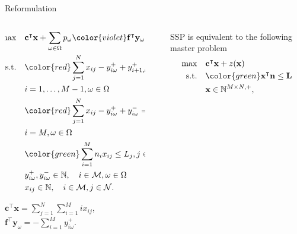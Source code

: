 \begin{frame}{Reformulation}
  \begin{columns}
    \begin{column}{0.49\textwidth}
      \begin{scriptsize}
        \begin{equation*}
          \begin{aligned}
          \hspace{-10mm}
          \max \quad & \mathbf{c}^{\intercal} \mathbf{x} + \sum_{\omega \in \Omega} p_{\omega} 
          {\color{violet} \mathbf{f}^{\intercal} \mathbf{y}_{\omega}} \\
          \text {s.t.} \quad & {\color{red}\sum_{j= 1}^{N} x_{ij}-y_{i \omega}^{+}+
          y_{i+1, \omega}^{+} + y_{i \omega}^{-}=d_{i \omega}}, \\ & i = 1,\ldots,M-1, \omega \in \Omega \\
          & {\color{red}\sum_{j= 1}^{N} x_{ij} -y_{i \omega}^{+}+y_{i \omega}^{-}=d_{i \omega}}, \\ & i = M, \omega \in \Omega \\
          & {\color{green}\sum_{i=1}^{M} n_{i} x_{ij} \leq L_j}, j \in \mathcal{N}\\
          & y_{i \omega}^{+}, y_{i \omega}^{-} \in \mathbb{N}, \quad i \in \mathcal{M}, \omega \in \Omega \\
          & x_{ij} \in \mathbb{N}, \quad i \in \mathcal{M}, j \in \mathcal{N}.
          \end{aligned}
        \end{equation*}
        \end{scriptsize}
        \begin{tiny}
              $\mathbf{c}^{\intercal} \mathbf{x} =\sum_{j=1}^{N} \sum_{i=1}^{M} i x_{ij}$, 
              $\mathbf{f}^{\intercal} \mathbf{y}_{\omega} = - \sum_{i=1}^{M} y_{i \omega}^{+}$.
        \end{tiny}
    \end{column}
    \begin{column}{.02\textwidth}
      \rule{.1mm}{0.7\textheight}
  \end{column}
    \begin{column}{0.49\textwidth}
      \scriptsize
      SSP is equivalent to the following master problem
      \begin{equation}\label{BD_master}
        \begin{aligned}
      \max \quad & \mathbf{c}^{\intercal} \mathbf{x}+ z(\mathbf{x}) \\
      \text {s.t.} \quad & {\color{green}\mathbf{x}^{\intercal} \mathbf{n} \leq \mathbf{L}} \\
      & \mathbf{x} \in \mathbb{N}^{M \times N, +},
      \end{aligned}
      \end{equation}


\end{column}
\end{columns}
\end{frame}

